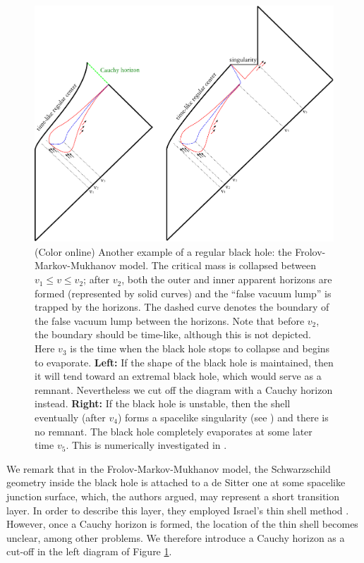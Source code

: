 \documentclass[12pt]{article}
\newcommand{\2}{$^2$}
\newcommand{\3}{$^3$}
\newcommand{\4}{$_4$}
\newcommand{\5}{$_5$}
\begin{document}
\begin{figure}
\begin{center}
\includegraphics[scale=0.48]{regular_3-eps-converted-to.pdf}
\caption{ \label{fig:regular} (Color online) Another example of a regular black hole: the Frolov-Markov-Mukhanov model. The critical mass is collapsed between $v_{1} \leqslant v \leqslant v_{2}$; after $v_{2}$, both the outer and inner apparent horizons are formed (represented by solid curves) and the ``false vacuum lump'' is trapped by the horizons. The dashed curve denotes the boundary of the false vacuum lump between the  horizons. Note that before $v_{2}$, the boundary should be time-like, although this is not depicted.  Here $v_{3}$ is the time when the black hole stops to collapse and begins to evaporate. \textbf{Left:} If the shape of the black hole is maintained, then it will tend toward an extremal black hole, which would serve as a remnant. Nevertheless we cut off the diagram with a Cauchy horizon instead. \textbf{Right:} If the black hole is unstable, then the shell eventually (after $v_{4}$) forms a spacelike singularity (see \cite{Yeom:2008qw1}) and there is no remnant. The black hole completely evaporates at some later time $v_5$. This is numerically investigated in \cite{Hwang:2012nn}.}
\end{center}
\end{figure}


We remark that in the Frolov-Markov-Mukhanov model, the Schwarzschild geometry inside the black hole is attached to a de Sitter one at some spacelike junction surface, which, the authors argued, may represent a short transition layer. In order to describe this layer, they employed Israel's thin shell method \cite{Israel}. However, once a Cauchy horizon is formed, the location of the thin shell becomes unclear, among other problems. We therefore introduce a Cauchy horizon as a cut-off in the left diagram of Figure \ref{fig:regular}. 
\end{document}
